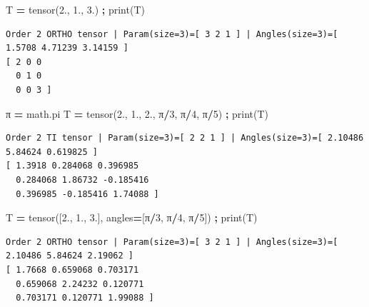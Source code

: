 \documentclass[
  a4paper,
  numbers=noendperiod,
  DIV=12]{scrreprt}
\newenvironment{Shaded}{\begin{snugshade}}{\end{snugshade}}
\newcommand{\BuiltInTok}[1]{#1}
\newcommand{\DecValTok}[1]{\textcolor[rgb]{0.00,0.00,0.81}{#1}}
\newcommand{\FloatTok}[1]{\textcolor[rgb]{0.00,0.00,0.81}{#1}}
\newcommand{\NormalTok}[1]{#1}
\newcommand{\OperatorTok}[1]{\textcolor[rgb]{0.81,0.36,0.00}{\textbf{#1}}}
\begin{document}
\begin{Shaded}
\begin{Highlighting}[]
\NormalTok{T }\OperatorTok{=}\NormalTok{ tensor(}\FloatTok{2.}\NormalTok{, }\FloatTok{1.}\NormalTok{, }\FloatTok{3.}\NormalTok{) }\OperatorTok{;} \BuiltInTok{print}\NormalTok{(T)}
\end{Highlighting}
\end{Shaded}

\begin{verbatim}
Order 2 ORTHO tensor | Param(size=3)=[ 3 2 1 ] | Angles(size=3)=[ 1.5708 4.71239 3.14159 ]
[ 2 0 0 
  0 1 0 
  0 0 3 ]
\end{verbatim}

\begin{Shaded}
\begin{Highlighting}[]
\NormalTok{π }\OperatorTok{=}\NormalTok{ math.pi}
\NormalTok{T }\OperatorTok{=}\NormalTok{ tensor(}\FloatTok{2.}\NormalTok{, }\FloatTok{1.}\NormalTok{, }\FloatTok{2.}\NormalTok{, π}\OperatorTok{/}\DecValTok{3}\NormalTok{, π}\OperatorTok{/}\DecValTok{4}\NormalTok{, π}\OperatorTok{/}\DecValTok{5}\NormalTok{) }\OperatorTok{;} \BuiltInTok{print}\NormalTok{(T)}
\end{Highlighting}
\end{Shaded}

\begin{verbatim}
Order 2 TI tensor | Param(size=3)=[ 2 2 1 ] | Angles(size=3)=[ 2.10486 5.84624 0.619825 ]
[ 1.3918 0.284068 0.396985 
  0.284068 1.86732 -0.185416 
  0.396985 -0.185416 1.74088 ]
\end{verbatim}

\begin{Shaded}
\begin{Highlighting}[]
\NormalTok{T }\OperatorTok{=}\NormalTok{ tensor([}\FloatTok{2.}\NormalTok{, }\FloatTok{1.}\NormalTok{, }\FloatTok{3.}\NormalTok{], angles}\OperatorTok{=}\NormalTok{[π}\OperatorTok{/}\DecValTok{3}\NormalTok{, π}\OperatorTok{/}\DecValTok{4}\NormalTok{, π}\OperatorTok{/}\DecValTok{5}\NormalTok{]) }\OperatorTok{;} \BuiltInTok{print}\NormalTok{(T)}
\end{Highlighting}
\end{Shaded}

\begin{verbatim}
Order 2 ORTHO tensor | Param(size=3)=[ 3 2 1 ] | Angles(size=3)=[ 2.10486 5.84624 2.19062 ]
[ 1.7668 0.659068 0.703171 
  0.659068 2.24232 0.120771 
  0.703171 0.120771 1.99088 ]
\end{verbatim}
\end{document}
